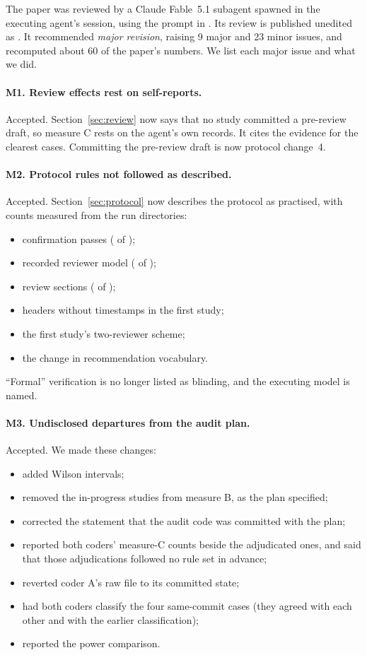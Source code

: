 The paper was reviewed by a Claude Fable~5.1 subagent spawned in the executing agent's session, using the prompt in
. Its review is published unedited as . It recommended
\emph{major revision}, raising 9 major and 23 minor issues, and recomputed about 60 of the paper's numbers. We list each
major issue and what we did.

\paragraph{M1. Review effects rest on self-reports.} Accepted. Section~\ref{sec:review} now says that no study
committed a pre-review draft, so measure C rests on the agent's own records. It cites the evidence for the clearest
cases. Committing the pre-review draft is now protocol change~4.

\paragraph{M2. Protocol rules not followed as described.} Accepted. Section~\ref{sec:protocol} now describes the
protocol as practised, with counts measured from the run directories:
\begin{itemize}
\item confirmation passes (\ReviewConfAmongFix{} of \ReviewFixOrRefuted{});
\item recorded reviewer model (\ReviewerModelRecorded{} of \StudiesReported{});
\item review sections (\ReviewSections{} of \StudiesReported{});
\item headers without timestamps in the first study;
\item the first study's two-reviewer scheme;
\item the change in recommendation vocabulary.
\end{itemize}
``Formal'' verification is no longer listed as blinding, and the executing model is named.

\paragraph{M3. Undisclosed departures from the audit plan.} Accepted. We made these changes:
\begin{itemize}
\item added Wilson intervals;
\item removed the in-progress studies from measure B, as the plan specified;
\item corrected the statement that the audit code was committed with the plan;
\item reported both coders' measure-C counts beside the adjudicated ones, and said that those adjudications followed
no rule set in advance;
\item reverted coder A's raw file to its committed state;
\item had both coders classify the four same-commit cases (they agreed with each other and with the earlier
classification);
\item reported the power comparison.
\end{itemize}

